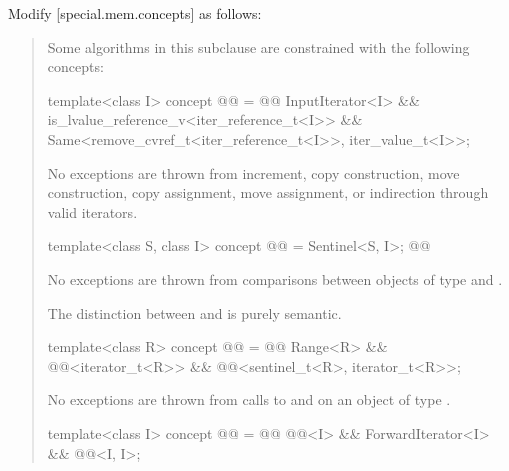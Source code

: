 Modify [special.mem.concepts] as follows:
\begin{quote}
\pnum
Some algorithms in this subclause are constrained with the following
 concepts:

\begin{itemdecl}
template<class I>
concept @@ = @@
  InputIterator<I> &&
  is_lvalue_reference_v<iter_reference_t<I>> &&
  Same<remove_cvref_t<iter_reference_t<I>>, iter_value_t<I>>;
\end{itemdecl}

\begin{itemdescr}
\pnum
No exceptions are thrown from increment,
copy construction, move construction,
copy assignment, move assignment,
or indirection through valid iterators.
\end{itemdescr}

\begin{itemdecl}
template<class S, class I>
concept @@ = Sentinel<S, I>; @@
\end{itemdecl}

\begin{itemdescr}
\pnum
No exceptions are thrown from comparisons between
objects of type  and .

\pnum
\begin{note}
The distinction between  and
 is purely semantic.
\end{note}
\end{itemdescr}

\begin{itemdecl}
template<class R>
concept @@ = @@
  Range<R> &&
  @@<iterator_t<R>> &&
  @@<sentinel_t<R>, iterator_t<R>>;
\end{itemdecl}

\begin{itemdescr}
\pnum No exceptions are thrown from calls to  and 
on an object of type .
\end{itemdescr}

\begin{itemdecl}
template<class I>
concept @@ = @@
  @@<I> &&
  ForwardIterator<I> &&
  @@<I, I>;
\end{itemdecl}


\end{quote}
